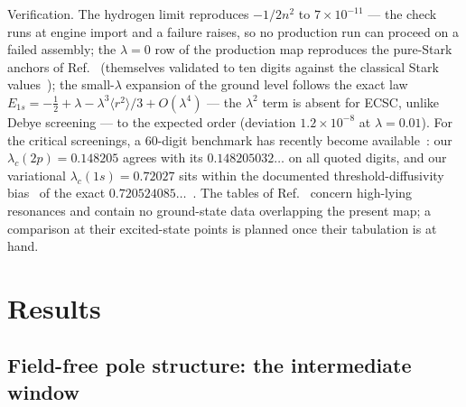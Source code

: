 \documentclass[aps,pre,twocolumn,superscriptaddress,floatfix,longbibliography]{revtex4-2}
\begin{document}
Verification. The hydrogen limit reproduces $-1/2n^{2}$ to
$7\times10^{-11}$ --- the check runs at engine import and a failure
raises, so no production run can proceed on a failed assembly; the
$\lambda=0$ row of the production map reproduces the pure-Stark
anchors of Ref.~\cite{companionD} (themselves validated to ten
digits against the classical Stark values~\cite{DamburgKolosov1976,
Kolosov1987,Jentschura2001}); the small-$\lambda$ expansion of the
ground level follows the exact law $E_{1s}=-\tfrac12+\lambda
-\lambda^{3}\langle r^{2}\rangle/3+O(\lambda^{4})$ --- the
$\lambda^{2}$ term is absent for ECSC, unlike Debye screening ---
to the expected order (deviation $1.2\times10^{-8}$ at
$\lambda=0.01$). For the critical screenings, a 60-digit benchmark
has recently become available~\cite{Bunker2026}: our
$\lambda_c(2p)=0.148205$ agrees with its
$0.148205032\ldots$ on all quoted digits, and our variational
$\lambda_c(1s)=0.72027$ sits within the documented
threshold-diffusivity bias~\cite{companionNR} of the exact
$0.720524085\ldots$~\cite{Bunker2026,JiaoCritical2021}. The tables
of Ref.~\cite{WangChenGuo2019} concern high-lying resonances and
contain no ground-state data overlapping the present map; a
comparison at their excited-state points is planned once their
tabulation is at hand.

\section{Results}
\label{sec:results}

\subsection{Field-free pole structure: the intermediate window}
\label{sec:fieldfree}
\end{document}
